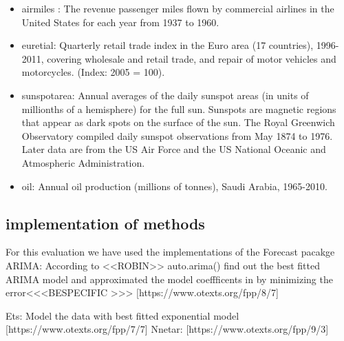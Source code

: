 \begin{itemize}
\item airmiles : The revenue passenger miles flown by commercial airlines in the United States for each year from 1937 to 1960.
\item euretial: Quarterly retail trade index in the Euro area (17 countries), 1996-2011, covering wholesale and retail trade, and repair of motor vehicles and motorcycles. (Index: 2005 = 100).
\item sunspotarea: Annual averages of the daily sunspot areas (in units of millionths of a hemisphere) for the full sun. Sunspots are magnetic regions that appear as dark spots on the surface of the sun. The Royal Greenwich Observatory compiled daily sunspot observations from May 1874 to 1976. Later data are from the US Air Force and the US National Oceanic and Atmospheric Administration.
\item oil: Annual oil production (millions of tonnes), Saudi Arabia, 1965-2010.
\end{itemize}



\subsection{implementation of methods}
For this evaluation we have used the implementations of the Forecast pacakge \cite{forecastPackage}
ARIMA: According to <<ROBIN>> auto.arima()  find out the best fitted ARIMA model and approximated the model coeffficents in by minimizing the error<<<BESPECIFIC >>> [https://www.otexts.org/fpp/8/7]

Ets: Model the data with best fitted exponential model [https://www.otexts.org/fpp/7/7]
    \cite{Wagner_2011}
	Nnetar: [https://www.otexts.org/fpp/9/3]
